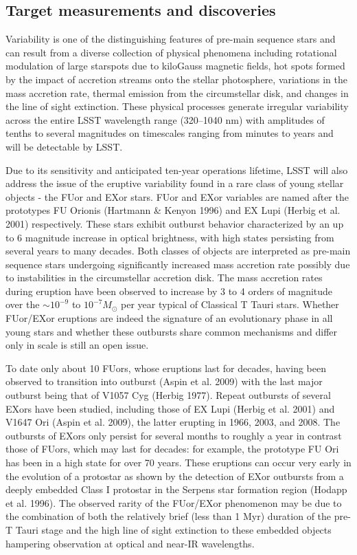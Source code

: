 
\subsection{Target measurements and discoveries}
\label{sec:\secname:targets}


Variability is one of the distinguishing features of pre-main sequence stars and can result from a
diverse collection of physical phenomena including rotational modulation of large starspots due to
kiloGauss magnetic fields, hot spots formed by the impact of accretion streams onto the stellar
photosphere, variations in the mass accretion rate, thermal emission from the circumstellar disk,
and changes in the line of sight extinction. These physical processes generate irregular variability
across the entire LSST wavelength range (320–1040 nm) with amplitudes of tenths to several
magnitudes on timescales ranging from minutes to years and will be detectable by LSST.

Due to its sensitivity and anticipated ten-year operations lifetime, LSST will also address the issue
of the eruptive variability found in a rare class of young stellar objects - the FUor and EXor stars.
FUor and EXor variables are named after the prototypes FU Orionis (Hartmann \& Kenyon 1996)
and EX Lupi (Herbig et al. 2001) respectively. These stars exhibit outburst behavior characterized
by an up to 6 magnitude increase in optical brightness, with high states persisting from several years
to many decades. Both classes of objects are interpreted as pre-main sequence stars undergoing
significantly increased mass accretion rate possibly due to instabilities in the circumstellar accretion
disk. The mass accretion rates during eruption have been observed to increase by 3 to 4 orders
of magnitude over the $\sim 10^{-9}$
to $10^{-7} M_{\odot}$ per year typical of Classical T Tauri stars. Whether
FUor/EXor eruptions are indeed the signature of an evolutionary phase in all young stars and
whether these outbursts share common mechanisms and differ only in scale is still an open issue.

To date only about 10 FUors, whose eruptions last for decades, having been observed to transition
into outburst (Aspin et al. 2009) with the last major outburst being that of V1057 Cyg (Herbig
1977). Repeat outbursts of several EXors have been studied, including those of EX Lupi (Herbig
et al. 2001) and V1647 Ori (Aspin et al. 2009), the latter erupting in 1966, 2003, and 2008. The
outbursts of EXors only persist for several months to roughly a year in contrast those of FUors,
which may last for decades: for example, the prototype FU Ori has been in a high state for over
70 years. These eruptions can occur very early in the evolution of a protostar as shown by the
detection of EXor outbursts from a deeply embedded Class I protostar in the Serpens star formation
region (Hodapp et al. 1996). The observed rarity of the FUor/EXor phenomenon may be due to
the combination of both the relatively brief (less than 1 Myr) duration of the pre-T Tauri stage
and the high line of sight extinction to these embedded objects hampering observation at optical
and near-IR wavelengths.

